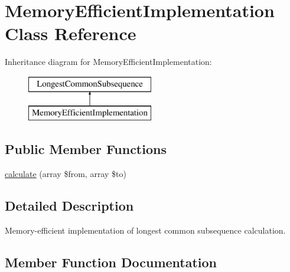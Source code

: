 \hypertarget{class_sebastian_bergmann_1_1_diff_1_1_l_c_s_1_1_memory_efficient_implementation}{}\section{Memory\+Efficient\+Implementation Class Reference}
\label{class_sebastian_bergmann_1_1_diff_1_1_l_c_s_1_1_memory_efficient_implementation}
Inheritance diagram for Memory\+Efficient\+Implementation\+:\begin{figure}[H]
\begin{center}
\leavevmode
\includegraphics[height=2.000000cm]{class_sebastian_bergmann_1_1_diff_1_1_l_c_s_1_1_memory_efficient_implementation}
\end{center}
\end{figure}
\subsection*{Public Member Functions}
\begin{DoxyCompactItemize}
\item 
\mbox{\hyperlink{class_sebastian_bergmann_1_1_diff_1_1_l_c_s_1_1_memory_efficient_implementation_a008d2ee23b87fa34470482270c5918a3}{calculate}} (array \$from, array \$to)
\end{DoxyCompactItemize}


\subsection{Detailed Description}
Memory-\/efficient implementation of longest common subsequence calculation. 

\subsection{Member Function Documentation}
\mbox{\label{class_sebastian_bergmann_1_1_diff_1_1_l_c_s_1_1_memory_efficient_implementation_a008d2ee23b87fa34470482270c5918a3}} 
